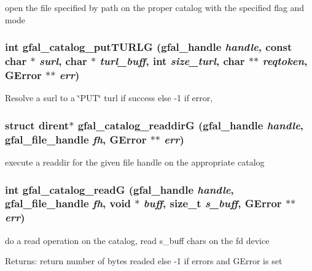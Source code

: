open the file specified by path on the proper catalog with the specified flag and mode 
\subsubsection{\setlength{\rightskip}{0pt plus 5cm}int gfal\_\-catalog\_\-put\-TURLG (gfal\_\-handle {\em handle}, const char $\ast$ {\em surl}, char $\ast$ {\em turl\_\-buff}, int {\em size\_\-turl}, char $\ast$$\ast$ {\em reqtoken}, GError $\ast$$\ast$ {\em err})}\label{gfal__common__catalog_8c_5531c279371aff9b96c007ce9cb55d1b}


Resolve a surl to a \char`\"{}PUT\char`\"{} turl  if success else -1 if error, 
\subsubsection{\setlength{\rightskip}{0pt plus 5cm}struct dirent$\ast$ gfal\_\-catalog\_\-readdir\-G (gfal\_\-handle {\em handle}, gfal\_\-file\_\-handle {\em fh}, GError $\ast$$\ast$ {\em err})}\label{gfal__common__catalog_8c_9ba0d48d73fe53d42d3a715e57473adb}


execute a readdir for the given file handle on the appropriate catalog 
\subsubsection{\setlength{\rightskip}{0pt plus 5cm}int gfal\_\-catalog\_\-read\-G (gfal\_\-handle {\em handle}, gfal\_\-file\_\-handle {\em fh}, void $\ast$ {\em buff}, size\_\-t {\em s\_\-buff}, GError $\ast$$\ast$ {\em err})}\label{gfal__common__catalog_8c_a0bc8955dc41f743a56c8d2fc68e2e1c}


do a read operation on the catalog, read s\_\-buff chars on the fd device \begin{Desc}
\item[Returns:]return number of bytes readed else -1 if errors and GError is set \end{Desc}
